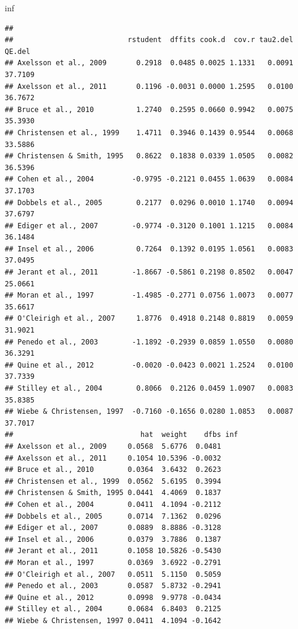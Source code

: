 \documentclass[
]{article}
\newenvironment{Shaded}{\begin{snugshade}}{\end{snugshade}}
\newcommand{\NormalTok}[1]{\textcolor[rgb]{0.80,0.80,0.80}{#1}}
\begin{document}
\begin{Shaded}
\begin{Highlighting}[]
\NormalTok{inf}
\end{Highlighting}
\end{Shaded}

\begin{verbatim}
## 
##                           rstudent  dffits cook.d  cov.r tau2.del  QE.del 
## Axelsson et al., 2009       0.2918  0.0485 0.0025 1.1331   0.0091 37.7109 
## Axelsson et al., 2011       0.1196 -0.0031 0.0000 1.2595   0.0100 36.7672 
## Bruce et al., 2010          1.2740  0.2595 0.0660 0.9942   0.0075 35.3930 
## Christensen et al., 1999    1.4711  0.3946 0.1439 0.9544   0.0068 33.5886 
## Christensen & Smith, 1995   0.8622  0.1838 0.0339 1.0505   0.0082 36.5396 
## Cohen et al., 2004         -0.9795 -0.2121 0.0455 1.0639   0.0084 37.1703 
## Dobbels et al., 2005        0.2177  0.0296 0.0010 1.1740   0.0094 37.6797 
## Ediger et al., 2007        -0.9774 -0.3120 0.1001 1.1215   0.0084 36.1484 
## Insel et al., 2006          0.7264  0.1392 0.0195 1.0561   0.0083 37.0495 
## Jerant et al., 2011        -1.8667 -0.5861 0.2198 0.8502   0.0047 25.0661 
## Moran et al., 1997         -1.4985 -0.2771 0.0756 1.0073   0.0077 35.6617 
## O'Cleirigh et al., 2007     1.8776  0.4918 0.2148 0.8819   0.0059 31.9021 
## Penedo et al., 2003        -1.1892 -0.2939 0.0859 1.0550   0.0080 36.3291 
## Quine et al., 2012         -0.0020 -0.0423 0.0021 1.2524   0.0100 37.7339 
## Stilley et al., 2004        0.8066  0.2126 0.0459 1.0907   0.0083 35.8385 
## Wiebe & Christensen, 1997  -0.7160 -0.1656 0.0280 1.0853   0.0087 37.7017 
##                              hat  weight    dfbs inf 
## Axelsson et al., 2009     0.0568  5.6776  0.0481     
## Axelsson et al., 2011     0.1054 10.5396 -0.0032     
## Bruce et al., 2010        0.0364  3.6432  0.2623     
## Christensen et al., 1999  0.0562  5.6195  0.3994     
## Christensen & Smith, 1995 0.0441  4.4069  0.1837     
## Cohen et al., 2004        0.0411  4.1094 -0.2112     
## Dobbels et al., 2005      0.0714  7.1362  0.0296     
## Ediger et al., 2007       0.0889  8.8886 -0.3128     
## Insel et al., 2006        0.0379  3.7886  0.1387     
## Jerant et al., 2011       0.1058 10.5826 -0.5430     
## Moran et al., 1997        0.0369  3.6922 -0.2791     
## O'Cleirigh et al., 2007   0.0511  5.1150  0.5059     
## Penedo et al., 2003       0.0587  5.8732 -0.2941     
## Quine et al., 2012        0.0998  9.9778 -0.0434     
## Stilley et al., 2004      0.0684  6.8403  0.2125     
## Wiebe & Christensen, 1997 0.0411  4.1094 -0.1642
\end{verbatim}
\end{document}
